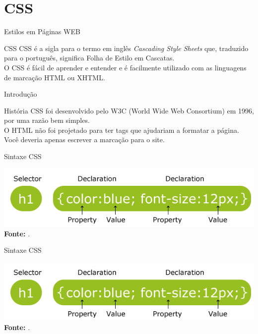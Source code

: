 \documentclass{beamer}
\begin{document}
\section{CSS}
\begin{frame}{Estilos em Páginas WEB}
\begin{block}{CSS}
CSS é a sigla para o termo em inglês \textit{Cascading Style Sheets} que, traduzido para o português, significa Folha de Estilo em Cascatas. \\
O CSS é fácil de aprender e entender e é facilmente utilizado com as linguagens de marcação HTML ou XHTML. 
\end{block}
\end{frame}
\begin{frame}{Introdução}
\begin{block}{História}
CSS foi desenvolvido pelo W3C (World Wide Web Consortium) em 1996, por uma razão bem simples. \\
O HTML não foi projetado para ter tags que ajudariam a formatar a página. \\
Você deveria apenas escrever a marcação para o site.
\end{block}
\end{frame}
\begin{frame}{Sintaxe CSS}
  \begin{center}
    \includegraphics[height=0.25\paperheight]{fig/aula3/css_sintax.png} \\
    \tiny \textbf{Fonte:} \cite{freeman2008use}.
  \end{center}
\end{frame}
\begin{frame}{Sintaxe CSS}
  \begin{center}
    \includegraphics[height=0.25\paperheight]{fig/aula3/css_sintax.png} \\
    \tiny \textbf{Fonte:} \cite{freeman2008use}.
  \end{center}
\end{frame}
\end{document}
